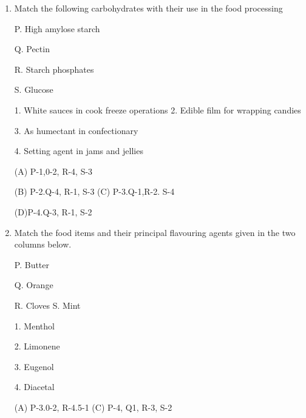 \documentclass[journal]{IEEEtran}
\begin{document}
\begin{enumerate}
(D) P-2.0-1.R-4.S-3

\item {Match the following carbohydrates with their use in the food processing}
\begin{minipage}{0.5\textwidth}
	\begin{flushleft}

P. High amylose starch

Q. Pectin

R. Starch phosphates

S. Glucose


		\end{flushleft}
		\end{minipage}
	\begin{minipage}{0.5\textwidth}
		\begin{flushright}

1. White sauces in cook freeze operations
2. Edible film for wrapping candies


3. As humectant in confectionary

4. Setting agent in jams and jellies
		\end{flushright}
		\end{minipage}



(A) P-1,0-2, R-4, S-3

(B) P-2.Q-4, R-1, S-3
(C) P-3.Q-1,R-2. S-4


(D)P-4.Q-3, R-1, S-2

\item {Match the food items and their principal flavouring agents given in the two columns below.}
\begin{minipage}{0.5\textwidth}
	\begin{flushleft}

P. Butter

Q. Orange


R. Cloves
S. Mint
		\end{flushleft}
		\end{minipage}
	\begin{minipage}{0.5\textwidth}
		\begin{flushright}
1. Menthol


2. Limonene


3. Eugenol


4. Diacetal
		\end{flushright}
		\end{minipage}


(A) P-3.0-2, R-4.5-1 (C) P-4, Q1, R-3, S-2


\end{enumerate}
\end{document}
